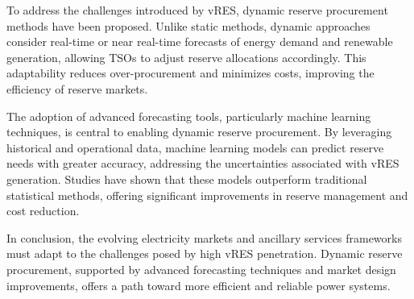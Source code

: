 To address the challenges introduced by \gls{vRES}, dynamic reserve procurement methods have been proposed. Unlike static methods, dynamic approaches consider real-time or near real-time forecasts of energy demand and renewable generation, allowing \gls{TSO}s to adjust reserve allocations accordingly. This adaptability reduces over-procurement and minimizes costs, improving the efficiency of reserve markets.

The adoption of advanced forecasting tools, particularly machine learning techniques, is central to enabling dynamic reserve procurement. By leveraging historical and operational data, machine learning models can predict reserve needs with greater accuracy, addressing the uncertainties associated with \gls{vRES} generation. Studies have shown that these models outperform traditional statistical methods, offering significant improvements in reserve management and cost reduction.

In conclusion, the evolving electricity markets and ancillary services frameworks must adapt to the challenges posed by high \gls{vRES} penetration. Dynamic reserve procurement, supported by advanced forecasting techniques and market design improvements, offers a path toward more efficient and reliable power systems.

